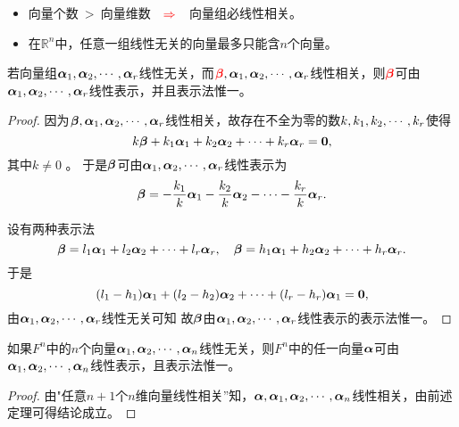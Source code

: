 \begin{frame}
\begin{zhu}
  \begin{itemize}
  \item    向量个数$~>~$向量维数 $~~\textcolor{red}{\Rightarrow}~~$ 向量组必线性相关。 
  \item     在$\mathbb R^n$中，任意一组线性无关的向量最多只能含$n$个向量。
  \end{itemize}
\end{zhu}
\end{frame}

\begin{frame}
\begin{dingli}
  若向量组$\boldsymbol{\alpha}_1,\boldsymbol{\alpha}_2,\cdots,\boldsymbol{\alpha}_r$线性无关，而$\textcolor{red}{\boldsymbol{\beta}},\boldsymbol{\alpha}_1,\boldsymbol{\alpha}_2,\cdots,\boldsymbol{\alpha}_r$线性相关，则$\textcolor{red}{\boldsymbol{\beta}}$可由$\boldsymbol{\alpha}_1,\boldsymbol{\alpha}_2,\cdots,\boldsymbol{\alpha}_r$线性表示，并且表示法惟一。
\end{dingli} 
\end{frame}

\begin{frame}
\begin{proof}
因为$\boldsymbol{\beta},\boldsymbol{\alpha}_1,\boldsymbol{\alpha}_2,\cdots,\boldsymbol{\alpha}_r$线性相关，故存在不全为零的数$k,k_1,k_2,\cdots,k_r$使得
$$
k\betabd + k_1\alphabd_1+k_2\alphabd_2+\cd+k_r\alphabd_r=\M0,
$$
其中$k\ne 0 $ 。  
于是$\boldsymbol{\beta}$可由$\boldsymbol{\alpha}_1,\boldsymbol{\alpha}_2,\cdots,\boldsymbol{\alpha}_r$线性表示为
$$
\boldsymbol{\beta}=-\frac{k_1}k\boldsymbol{\alpha}_1-\frac{k_2}k\boldsymbol{\alpha}_2-\cdots-\frac{k_r}k\boldsymbol{\alpha}_r.
$$ \pause 

 \quad 设有两种表示法
$$
\boldsymbol{\beta}=l_1\boldsymbol{\alpha}_1+l_2\boldsymbol{\alpha}_2+\cdots+l_r\boldsymbol{\alpha}_r,\quad
\boldsymbol{\beta}=h_1\boldsymbol{\alpha}_1+h_2\boldsymbol{\alpha}_2+\cdots+h_r\boldsymbol{\alpha}_r.
$$ 
于是
$$
(l_1-h_1)\alphabd_1+(l_2-h_2)\alphabd_2+\cd+(l_r-h_r)\alphabd_1=\M0,
$$ 
由$\boldsymbol{\alpha}_1,\boldsymbol{\alpha}_2,\cdots,\boldsymbol{\alpha}_r$线性无关可知
故$\boldsymbol{\beta}$由$\boldsymbol{\alpha}_1,\boldsymbol{\alpha}_2,\cdots,\boldsymbol{\alpha}_r$线性表示的表示法惟一。
\end{proof}
\end{frame}

\begin{frame}
\begin{tuilun}
  如果$F^n$中的$n$个向量$\boldsymbol{\alpha}_1,\boldsymbol{\alpha}_2,\cdots,\boldsymbol{\alpha}_n$线性无关，则$F^n$中的任一向量$\boldsymbol{\alpha}$可由$\boldsymbol{\alpha}_1,\boldsymbol{\alpha}_2,\cdots,\boldsymbol{\alpha}_n$线性表示，且表示法惟一。
\end{tuilun}\pause 
\begin{proof}
由"任意$n+1$个$n$维向量线性相关''知，$\boldsymbol{\alpha},\boldsymbol{\alpha}_1,\boldsymbol{\alpha}_2,\cdots,\boldsymbol{\alpha}_n$线性相关，由前述定理可得结论成立。
\end{proof}
\end{frame}

